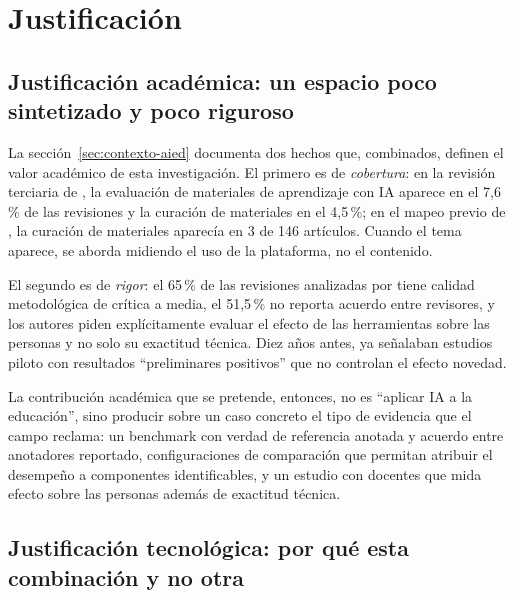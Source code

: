\section{Justificación}
\label{sec:justificacion}

\subsection{Justificación académica: un espacio poco sintetizado y poco riguroso}
\label{sec:just-academica}

La sección~\ref{sec:contexto-aied} documenta dos hechos que, combinados, definen el
valor académico de esta investigación. El primero es de \emph{cobertura}: en la
revisión terciaria de \textcite{bond2024meta}, la evaluación de materiales de
aprendizaje con IA aparece en el 7,6\,\% de las revisiones y la curación de
materiales en el 4,5\,\%; en el mapeo previo de \textcite{zawacki2019systematic}, la
curación de materiales aparecía en 3 de 146 artículos. Cuando el tema aparece, se
aborda midiendo el uso de la plataforma, no el contenido.

El segundo es de \emph{rigor}: el 65\,\% de las revisiones analizadas por
\textcite{bond2024meta} tiene calidad metodológica de crítica a media, el 51,5\,\%
no reporta acuerdo entre revisores, y los autores piden explícitamente evaluar el
efecto de las herramientas sobre las personas y no solo su exactitud técnica. Diez
años antes, \textcite{zawacki2019systematic} ya señalaban estudios piloto con
resultados \enquote{preliminares positivos} que no controlan el efecto novedad.

La contribución académica que se pretende, entonces, no es \enquote{aplicar IA a la
educación}, sino producir sobre un caso concreto el tipo de evidencia que el campo
reclama: un benchmark con verdad de referencia anotada y acuerdo entre anotadores
reportado, configuraciones de comparación que permitan atribuir el desempeño a
componentes identificables, y un estudio con docentes que mida efecto sobre las
personas además de exactitud técnica.

\subsection{Justificación tecnológica: por qué esta combinación y no otra}
\label{sec:just-tecnologica}


